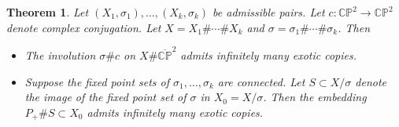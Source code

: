 \documentclass{amsart}
\newtheorem{theorem}{Theorem}[section]
\theoremstyle{definition}
\theoremstyle{remark}
\numberwithin{equation}{section}
\begin{document}
\begin{theorem}\label{thm:exotic}
Let $(X_1, \sigma_1), \dots , (X_k , \sigma_k)$ be admissible pairs. Let $c : \mathbb{CP}^2 \to \mathbb{CP}^2$ denote complex conjugation. Let $X = X_1 \# \cdots \# X_k$ and $\sigma = \sigma_1 \# \cdots \# \sigma_k$. Then 
\begin{itemize}
\item[(1)]{The involution $\sigma \# c$ on $X \# \overline{\mathbb{CP}}^2$ admits infinitely many exotic copies.}
\item[(2)]{Suppose the fixed point sets of $\sigma_1, \dots , \sigma_k$ are connected. Let $S \subset X/\sigma$ denote the image of the fixed point set of $\sigma$ in $X_0 = X/\sigma$. Then the embedding $P_+ \# S \subset X_0$ admits infinitely many exotic copies.}
\end{itemize}
\end{theorem}
\end{document}
